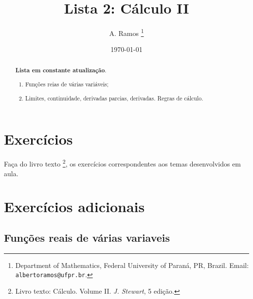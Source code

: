 \documentclass[11pt]{article}
\begin{document}
\title{Lista 2: Cálculo II }
 
\author{
A. Ramos \thanks{Department of Mathematics,
    Federal University of Paraná, PR, Brazil.
    Email: {\tt albertoramos@ufpr.br}.}
}

\date{\today}
 
\maketitle

\begin{abstract}
{\bf Lista em constante atualização}.
 \begin{enumerate}
 \item Funções reias de várias variáveis;
 \item Limites, continuidade, derivadas parcias, derivadas. Regras de cálculo. 
 \end{enumerate}
\end{abstract}

 
  \section{Exercícios}   
 
 Faça do livro texto \footnote{Livro texto: Cálculo. Volume II. {\it J. Stewart}, 5 edição.}, os exercícios correspondentes aos temas desenvolvidos em aula. 
  
  \section{Exercícios adicionais}
    \subsection{Funções reais de várias variaveis}
     
\end{document}
